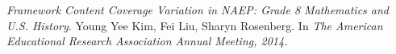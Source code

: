 
\begin{thebibliography}{1}
\emph{Framework Content Coverage Variation in NAEP: Grade 8 Mathematics and U.S. History}. Young Yee Kim, Fei Liu, Sharyn Rosenberg. In \emph{The American Educational Research Association Annual Meeting, 2014.}
\end{thebibliography}